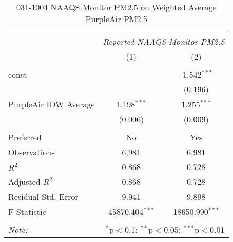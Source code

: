 \begin{table}[!htbp] \centering
  \caption{031-1004 NAAQS Monitor PM2.5 on Weighted Average PurpleAir PM2.5}
  \label{tab:reg_031-1004}
\begin{tabular}{@{\extracolsep{5pt}}lcc}
\\[-1.8ex]\hline
\hline \\[-1.8ex]
& \multicolumn{2}{c}{\textit{Reported NAAQS Monitor PM2.5}} \
\cr \cline{2-3}
\\[-1.8ex] & (1) & (2) \\
\hline \\[-1.8ex]
 const & & -1.542$^{***}$ \\
  & & (0.196) \\
 PurpleAir IDW Average & 1.198$^{***}$ & 1.255$^{***}$ \\
  & (0.006) & (0.009) \\
\hline \\[-1.8ex]
 Preferred & No & Yes \\
 Observations & 6,981 & 6,981 \\
 $R^2$ & 0.868 & 0.728 \\
 Adjusted $R^2$ & 0.868 & 0.728 \\
 Residual Std. Error & 9.941 & 9.898  \\
 F Statistic & 45870.404$^{***}$  & 18650.990$^{***}$  \\
\hline
\hline \\[-1.8ex]
\textit{Note:} & \multicolumn{2}{r}{$^{*}$p$<$0.1; $^{**}$p$<$0.05; $^{***}$p$<$0.01} \\
\end{tabular}
\end{table}